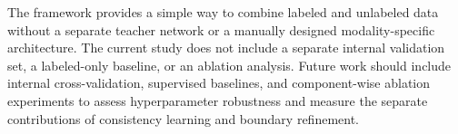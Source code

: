 \documentclass[runningheads]{llncs}
\begin{document}
The framework provides a simple way to combine labeled and unlabeled
data without a separate teacher network or a manually designed
modality-specific architecture. The current study does not include a
separate internal validation set, a labeled-only baseline, or an
ablation analysis. Future work should include internal cross-validation,
supervised baselines, and component-wise ablation experiments to assess
hyperparameter robustness and measure the separate contributions of
consistency learning and boundary refinement.

%
%


%
\end{document}
